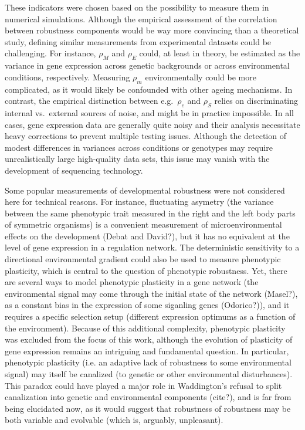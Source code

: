 \documentclass[a4paper]{article}
\newcommand{\stability}{{\rho_S}}
\newcommand{\earlyenv}{{\rho_E}}
\newcommand{\lateenv}{{\rho_e}}
\newcommand{\earlymut}{{\rho_M}}
\newcommand{\latemut}{{\rho_m}}
\begin{document}
These indicators were chosen based on the possibility to measure them in numerical simulations. Although the empirical assessment of the correlation between robustness components would be way more convincing than a theoretical study, defining similar measurements from experimental datasets could be challenging. For instance, $\earlymut$ and $\earlyenv$ could, at least in theory, be estimated as the variance in gene expression across genetic backgrounds or across environmental conditions, respectively. Measuring $\latemut$ environmentally could be more complicated, as it would likely be confounded with other ageing mechanisms. In contrast, the empirical distinction between e.g.\ $\lateenv$ and $\stability$ relies on discriminating internal vs.\ external sources of noise, and might be in practice impossible. In all cases, gene expression data are generally quite noisy and their analysis necessitate heavy corrections to prevent multiple testing issues. Although the detection of modest differences in variances across conditions or genotypes may require unrealistically large high-quality data sets, this issue may vanish with the development of sequencing technology. 

Some popular measurements of developmental robustness were not considered here for technical reasons. For instance, fluctuating asymetry (the variance between the same phenotypic trait measured in the right and the left body parts of symmetric organisms) is a convenient measurement of microenvironmental effects on the development (Debat and David?), but it has no equivalent at the level of gene expression in a regulation network. The deterministic sensitivity to a directional environmental gradient could also be used to measure phenotypic plasticity, which is central to the question of phenotypic robustness. Yet, there are several ways to model phenotypic plasticity in a gene network (the environmental signal may come through the initial state of the network (Masel?), as a constant bias in the expression of some siganling genes (Odorico?)), and it requires a specific selection setup (different expression optimums as a function of the environment). Because of this additional complexity, phenotypic plasticity was excluded from the focus of this work, although the evolution of plasticity of gene expression remains an intriguing and fundamental question. In particular, phenotypic plasticity (i.e. an adaptive lack of robustness to some environmental signal) may itself be canalized (to genetic or other environmental disturbances). This paradox could have played a major role in Waddington's refusal to split canalization into genetic and environmental components (cite?), and is far from being elucidated now, as it would suggest that robustness of robustness may be both variable and evolvable (which is, arguably, unpleasant).  
\end{document}
